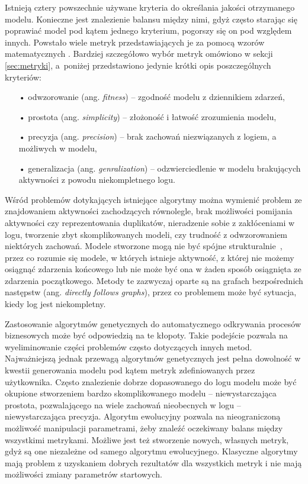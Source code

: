 Istnieją cztery powszechnie używane kryteria do określania jakości otrzymanego modelu. Konieczne jest znalezienie balansu między nimi, gdyż często starając się poprawiać model pod kątem jednego kryterium, pogorszy się on pod względem innych. Powstało wiele metryk przedstawiających je za pomocą wzorów matematycznych \cite{conf-propositions, Blum2015MetricsIP}. Bardziej szczegółowo wybór metryk omówiono w sekcji \ref{sec:metryki}, a~poniżej przedstawiono jedynie krótki opis poszczególnych kryteriów:
\begin{itemize}
  \item[•] odwzorowanie (ang. \textit{fitness}) -- zgodność modelu z dziennikiem zdarzeń,
  \item[•] prostota (ang. \textit{simplicity}) -- złożoność i łatwość zrozumienia modelu,
  \item[•] precyzja (ang. \textit{precision}) -- brak zachowań niezwiązanych z logiem, a możliwych w modelu,
  \item[•] generalizacja (ang. \textit{genralization}) -- odzwierciedlenie w modelu brakujących aktywności z powodu niekompletnego logu.
\end{itemize}


Wśród problemów dotykających istniejące algorytmy można wymienić problem ze znajdowaniem aktywności zachodzących równolegle, brak możliwości pomijania aktywności czy reprezentowania duplikatów, nieradzenie sobie z zakłóceniami w logu, tworzenie zbyt skomplikowanych modeli, czy trudność z odwzorowaniem niektórych zachowań. Modele stworzone mogą nie być spójne strukturalnie~\mbox{\cite{dongen2006b, StructuralDetectionofDeadlocks}}, przez co rozumie się modele, w których istnieje aktywność, z której nie możemy osiągnąć zdarzenia końcowego lub nie może być ona w żaden sposób osiągnięta ze zdarzenia początkowego. Metody te zazwyczaj oparte są na grafach bezpośrednich następstw (ang. \textit{directly follows graphs}), przez co problemem może być sytuacja, kiedy log jest niekompletny. 

Zastosowanie algorytmów genetycznych do automatycznego odkrywania procesów biznesowych może być odpowiedzią na te kłopoty. Takie podejście pozwala na wyeliminowanie części problemów często dotyczących innych metod. Najważniejszą jednak przewagą algorytmów genetycznych jest pełna dowolność w kwestii generowania modelu pod kątem metryk zdefiniowanych przez użytkownika. Często znalezienie dobrze dopasowanego do logu modelu może być okupione stworzeniem bardzo skomplikowanego modelu -- niewystarczająca prostota, pozwalającego na wiele zachowań nieobecnych w logu -- niewystarczająca precyzja. Algorytm ewolucyjny pozwala na nieograniczoną możliwość manipulacji parametrami, żeby znaleźć oczekiwany balans między wszystkimi metrykami. Możliwe jest też stworzenie nowych, własnych metryk, gdyż są one niezależne od samego algorytmu ewolucyjnego. Klasyczne algorytmy mają problem z uzyskaniem dobrych rezultatów dla wszystkich metryk i nie mają możliwości zmiany parametrów startowych.

